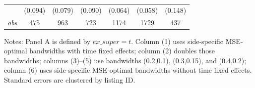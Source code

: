 \begin{table}[!htbp]
\begin{tabular}{lcccccc}
 & (0.094) & (0.079) & (0.090) & (0.064) & (0.058) & (0.148) \\
\textit{obs} & 475 & 963 & 723 & 1174 & 1729 & 437 \\
\hline
\end{tabular}
\begin{minipage}{0.98\textwidth}\footnotesize
Notes: Panel A is defined by $ex\_super=t$. Column (1) uses side-specific MSE-optimal bandwidths with time fixed effects; column (2) doubles those bandwidths; columns (3)--(5) use bandwidths (0.2,0.1), (0.3,0.15), and (0.4,0.2); column (6) uses side-specific MSE-optimal bandwidths without time fixed effects. Standard errors are clustered by listing ID.
\end{minipage}
\end{table}
